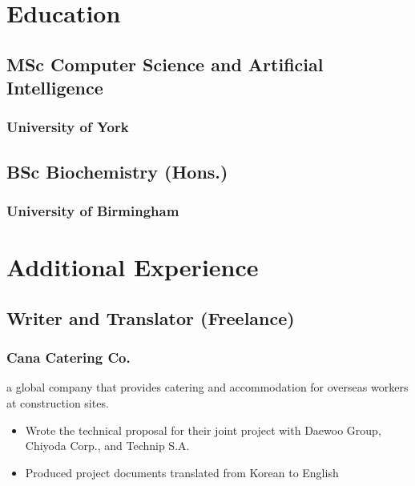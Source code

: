 \documentclass{article}
\begin{document}
\begin{paracol}{2}
  \section{Education}
  \subsection{MSc Computer Science and Artificial Intelligence}
  \subsubsection{University of York}
  \hspace*{\fill}{\small Ongoing}

  \subsection{BSc Biochemistry (Hons.)}
  \subsubsection{University of Birmingham}
  \hspace*{\fill}{\small Graduated 2019}

  \section{Additional Experience}
  \subsection{Writer and Translator (Freelance)}
  \subsubsection{Cana Catering Co.}
  {\color{LightGrey}\scriptsize\href{http://cana-catering.com}{\faExternalLink}}
  \hspace*{\fill}{\color{TitleGrey}{\scriptsize\faCalendar}\hspace{5pt}{\small09/2019 -- 11/2019}}

  {\noindent\small a global company that provides catering and accommodation for overseas workers at construction sites.}
  \begin{itemize}[leftmargin=*]
    \item Wrote the technical proposal for their joint project with Daewoo Group, Chiyoda Corp., and Technip S.A.
    \item Produced project documents translated from Korean to English
  \end{itemize}


\end{paracol}
\end{document}
